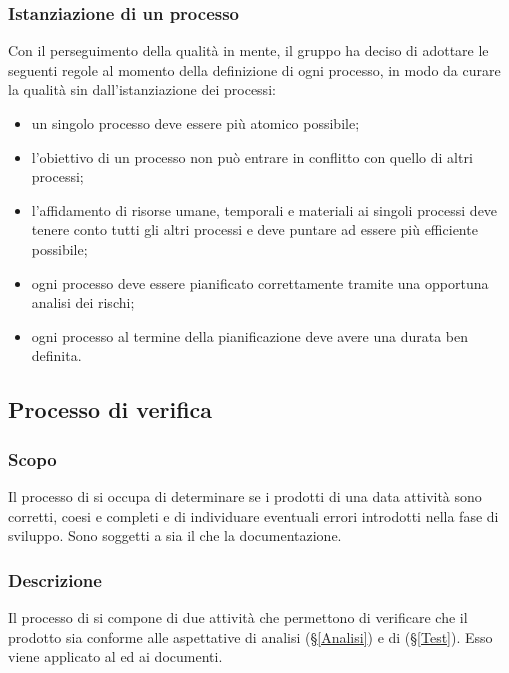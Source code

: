\subsubsection{Istanziazione di un processo}
Con il perseguimento della qualità in mente, il gruppo \textit{\Gruppo{}} ha deciso di adottare le seguenti regole al momento della definizione di ogni processo, in modo da curare la qualità sin dall'istanziazione dei processi:
\begin{itemize}
	\item un singolo processo deve essere più atomico possibile;
	\item l'obiettivo di un processo non può entrare in conflitto con quello di altri processi;
	\item l'affidamento di risorse umane, temporali e materiali ai singoli processi deve tenere conto tutti gli altri processi e deve puntare ad essere più efficiente possibile;
	\item ogni processo deve essere pianificato correttamente tramite una opportuna analisi dei rischi;
	\item ogni processo al termine della pianificazione deve avere una durata ben definita.
\end{itemize}
\subsection{Processo di verifica}
\subsubsection{Scopo}
Il processo di  si occupa di determinare se i prodotti di una data attività sono corretti, coesi e completi e di individuare eventuali errori introdotti nella fase di sviluppo. Sono soggetti a  sia il  che la documentazione.
\subsubsection{Descrizione}
Il processo di  si compone di due attività che permettono di verificare che il prodotto sia conforme alle aspettative di analisi (\S{}\ref{Analisi}) e di  (\S{}\ref{Test}). Esso viene applicato al  ed ai documenti.
